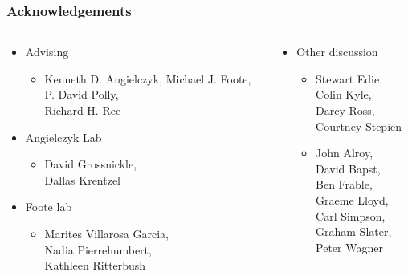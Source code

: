 \documentclass{beamer}
\begin{document}
\begin{frame}
  \frametitle{Acknowledgements}
  \begin{columns}
    \begin{column}{0.5\textwidth}
      \begin{itemize}
        \item Advising
          \begin{itemize}
            \item Kenneth D. Angielczyk, Michael J. Foote, \\P. David Polly, \\Richard H. Ree
          \end{itemize}
        \item Angielczyk Lab
          \begin{itemize}
            \item David Grossnickle, \\Dallas Krentzel
          \end{itemize}
        \item Foote lab
          \begin{itemize}
            \item Marites Villarosa Garcia, \\Nadia Pierrehumbert, \\Kathleen Ritterbush
          \end{itemize}
      \end{itemize}
    \end{column}
    \begin{column}{0.5\textwidth}
      \begin{itemize}
        \item Other discussion
          \begin{itemize}
            \item Stewart Edie, \\Colin Kyle, \\Darcy Ross, \\Courtney Stepien
            \item John Alroy, \\David Bapst, \\Ben Frable, \\Graeme Lloyd, \\Carl Simpson, \\Graham Slater, \\Peter Wagner
          \end{itemize}
      \end{itemize}
    \end{column}
  \end{columns}
\end{frame}
\end{document}
